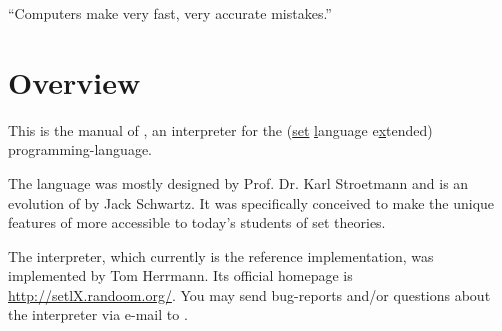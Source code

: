 


\globalDate{\today}







\begin{titlepage}
\maketitle

\vfill

\begin{center}
\Large
``Computers make very fast, very accurate mistakes.''
\end{center}

\vfill
\tableofcontents
\end{titlepage}

\section{Overview}

This is the manual of \setlX, an interpreter for the \SetlX{} (\underline{set} \underline{l}anguage e\underline{x}tended) programming-language.

The \SetlX{} language was mostly designed by Prof. Dr. Karl Stroetmann and is an evolution of \Setl{} by Jack Schwartz. It was specifically conceived to make the unique features of \Setl{} more accessible to today's students of set theories.

The \setlX{} interpreter, which currently is the \SetlX{} reference implementation, was implemented by Tom Herrmann. Its official homepage is \url{http://setlX.randoom.org/}. You may send bug-reports and\slash{}or questions about the \setlX{} interpreter via e-mail to .


